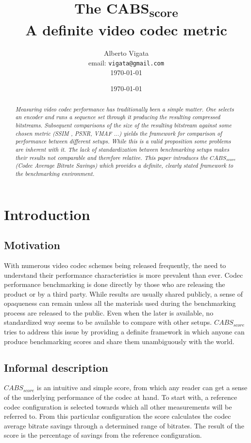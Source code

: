 \documentclass[12pt, conference, hidelinks, onecolumn]{IEEEtran}
\title{The CABS\textsubscript{score} \\ A definite video codec metric}
\author{Alberto Vigata\\ email: {\tt vigata@gmail.com}\\ \today}
\date{\today}
\begin{document}
    \maketitle
    \vspace{1mm}
    \begin{abstract}
    \textit{
    \noindent
Measuring video codec performance has traditionally been a simple matter. One selects an encoder and runs a sequence set through it producing the resulting compressed bitstreams. Subsequent comparisons of the size of the resulting bitstream against some chosen metric (SSIM \cite{ssim}, PSNR, VMAF\cite{vmaf} ...) yields the framework for comparison of performance between different setups. While this is a valid proposition some problems are inherent with it. The lack of standardization between benchmarking setups makes their results not comparable and therefore relative. This paper introduces the $CABS_{score}$ (Codec Average Bitrate Savings) which provides a definite, clearly stated framework to the benchmarking environment.
    }
    \end{abstract}
    \vspace{3mm}



\section{Introduction}


\subsection{Motivation}
	With numerous video codec schemes being released frequently, the need to understand their performance characteristics is more prevalent than ever. Codec performance benchmarking is done directly by those who are releasing the product or by a third party. While results are usually shared publicly, a sense of opaqueness can remain unless all the materials used during the benchmarking process are released to the public. Even when the later is available, no standardized way seems to be available to compare with other setups. $CABS_{score}$ tries to address this issue by providing a definite framework in which anyone can produce benchmarking scores and share them unambiguously with the world.

\subsection{Informal description}
$CABS_{score}$ is an intuitive and simple score, from which any reader can get a sense of the underlying performance of the codec at hand. To start with, a reference codec configuration is selected towards which all other measurements will be referred to. From this particular configuration the score calculates the codec average bitrate savings through a determined range of bitrates. The result of the score is the percentage of savings from the reference configuration.
\end{document}
